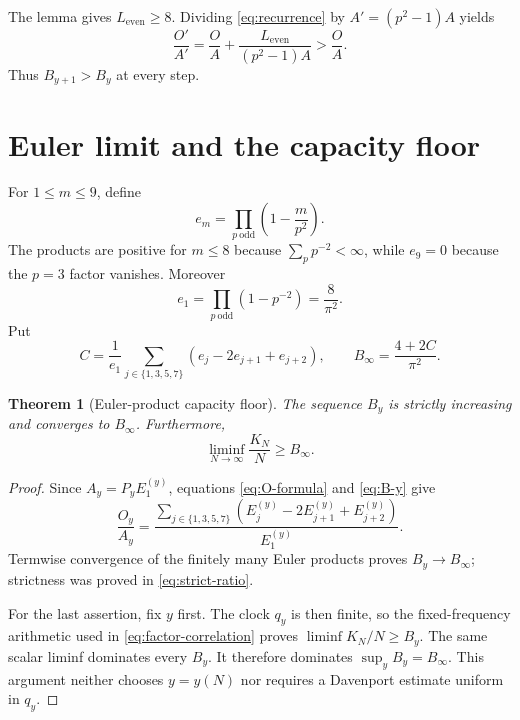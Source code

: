 \documentclass[11pt]{article}
\newtheorem{theorem}{Theorem}[section]
\theoremstyle{definition}
\theoremstyle{remark}
\begin{document}
The lemma gives $L_{\mathrm{even}}\ge8$.  Dividing \eqref{eq:recurrence} by
$A'=(p^2-1)A$ yields
\begin{equation}
        \frac{O'}{A'}=\frac OA+
        \frac{L_{\mathrm{even}}}{(p^2-1)A}>\frac OA.
 \label{eq:strict-ratio}
\end{equation}
Thus $B_{y+1}>B_y$ at every step.

\section{Euler limit and the capacity floor}

For $1\le m\le9$, define
\begin{equation}
 e_m=\prod_{p\ \mathrm{odd}}\left(1-\frac{m}{p^2}\right).
 \label{eq:e-infinite}
\end{equation}
The products are positive for $m\le8$ because $\sum_p p^{-2}<\infty$, while
$e_9=0$ because the $p=3$ factor vanishes.  Moreover
\begin{equation}
             e_1=\prod_{p\ \mathrm{odd}}(1-p^{-2})=\frac8{\pi^2}.
 \label{eq:e-one}
\end{equation}
Put
\begin{equation}
 C=\frac{1}{e_1}\sum_{j\in\{1,3,5,7\}}
       (e_j-2e_{j+1}+e_{j+2}),
 \qquad
 B_\infty=\frac{4+2C}{\pi^2}.
 \label{eq:B-infinity}
\end{equation}

\begin{theorem}[Euler-product capacity floor]
The sequence $B_y$ is strictly increasing and converges to $B_\infty$.
Furthermore,
\begin{equation}
       \boxed{\displaystyle
       \liminf_{N\to\infty}\frac{K_N}{N}\ge B_\infty.}
 \label{eq:limit-floor}
\end{equation}
\end{theorem}

\begin{proof}
Since $A_y=P_yE_1^{(y)}$, equations \eqref{eq:O-formula} and
\eqref{eq:B-y} give
\[
 \frac{O_y}{A_y}=
 \frac{\sum_{j\in\{1,3,5,7\}}
 (E_j^{(y)}-2E_{j+1}^{(y)}+E_{j+2}^{(y)})}{E_1^{(y)}}.
\]
Termwise convergence of the finitely many Euler products proves
$B_y\to B_\infty$; strictness was proved in \eqref{eq:strict-ratio}.

For the last assertion, fix $y$ first.  The clock $q_y$ is then finite, so
the fixed-frequency arithmetic used in \eqref{eq:factor-correlation} proves
$\liminf K_N/N\ge B_y$.  The same scalar liminf dominates every $B_y$.
It therefore dominates $\sup_yB_y=B_\infty$.  This argument neither chooses
$y=y(N)$ nor requires a Davenport estimate uniform in $q_y$.
\end{proof}
\end{document}
